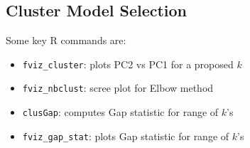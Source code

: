 \bigskip

\subsection{Cluster Model Selection}

\medskip

Some key R commands are:
\begin{itemize}
    \item \texttt{fviz\_cluster}: plots PC2 vs PC1 for a proposed $k$
    \item \texttt{fviz\_nbclust}: scree plot for Elbow method
    \item \texttt{clusGap}: computes Gap statistic for range of $k$’s
    \item \texttt{fviz\_gap\_stat}: plots Gap statistic for range of $k$’s
\end{itemize}

\medskip

